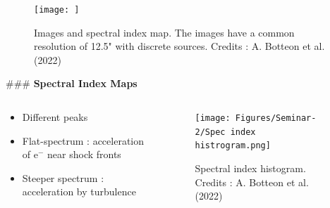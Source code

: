 \documentclass[aspectratio=169]{beamer}
\begin{document}
\begin{markdown}
\begin{frame}[plain]
\end{frame}


\begin{frame}[plain]



\begin{figure}
    \centering
    \texttt{[image: ]}
    \vspace{67mm}
    \caption{Images and spectral index map. The images have a common resolution of 12.5" with discrete sources. Credits : A. Botteon et al. (2022)}
    \label{}
\end{figure}
    
\end{frame}


### \huge{\textbf{Spectral Index Maps}}

\begin{columns}
    \begin{column}{0.6\textwidth} 
         \begin{itemize}
             \item Different peaks
             \item Flat-spectrum : acceleration of $\text{e}^-$ near shock fronts
             \item Steeper spectrum : acceleration by turbulence
        \end{itemize}
    \end{column}
    \begin{column}{0.4\textwidth}
    \begin{figure}
        \centering
        \texttt{[image: Figures/Seminar-2/Spec index histrogram.png]}
        \vspace{-6mm}
        \caption{Spectral index histogram. Credits : A. Botteon et al. (2022)}
        \label{}
    \end{figure}
    \end{column}
\end{columns}


\end{markdown}
\end{document}

